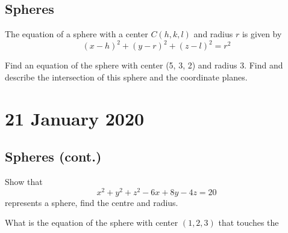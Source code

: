 \documentclass[twoside]{report}
\begin{document}
    \section{Spheres}
    \begin{definition}
        The equation of a sphere with a center $C(h, k, l)$ and radius $r$ is given by
        \begin{equation}
            (x - h)^{2} + (y - r)^{2} + (z - l)^{2} = r^{2}
        \end{equation}
    \end{definition}
    \begin{example}
        Find an equation of the sphere with center (5, 3, 2) and radius 3. Find and describe the intersection of this sphere and the coordinate planes.
    \end{example}
    \chapter{21 January 2020}
    \section{Spheres (cont.)}
    \begin{example}
        Show that
        \begin{equation}
            x^{2} + y^{2} + z^{2} - 6x + 8y - 4z = 20
        \end{equation}
        represents a sphere, find the centre and radius.
    \end{example}
    \begin{example}
        What is the equation of the sphere with center $(1, 2, 3)$ that touches the \xy
    \end{example}
\end{document}
